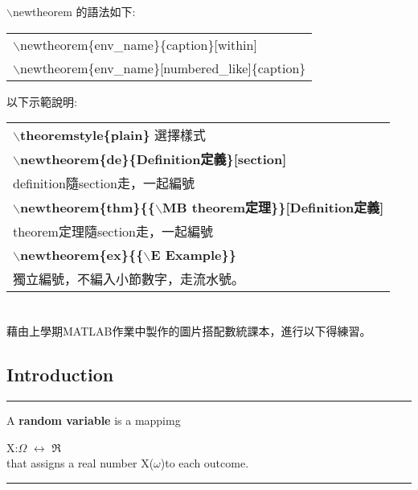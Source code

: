 $\backslash$newtheorem 的語法如下:\\
\begin{center}\colorbox{slight}{\begin{tabular}{l}
$\backslash$newtheorem\{env\_name\}\{caption\}[within]\\
$\backslash$newtheorem\{env\_name\}[numbered\_like]\{caption\}\\
\end{tabular}}\end{center}
以下示範說明:\\
\begin{center}\colorbox{slight}{\begin{tabular}{l}

\textbf{$\backslash$theoremstyle\{plain\}} 選擇樣式\\
\textbf{$\backslash$newtheorem\{de\}\{Definition定義\}[section]}\\
definition隨section走，一起編號\\
\textbf{$\backslash$newtheorem\{thm\}\{\{$\backslash$MB theorem定理\}\}[Definition定義]}\\
theorem定理隨section走，一起編號\\
\textbf{$\backslash$newtheorem\{ex\}\{\{$\backslash$E Example\}\}}\\
獨立編號，不編入小節數字，走流水號。\\
\end{tabular}}\end{center}
\section{ }
藉由上學期MATLAB作業中製作的圖片搭配數統課本，進行以下得練習。

\subsection{Introduction}

{\color{slight}\rule{\textwidth}{0.2pt}}
\begin{de} 
A \textbf{random variable} is a mappimg\\
 \begin{center}
 X:$\Omega$ $\longleftrightarrow$ $\Re$\\
that assigns a real number X($\omega$)to each outcome.\\
\end{center} 
{\color{slight}\rule{\textwidth}{0.2pt}}
\end{de}

